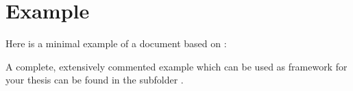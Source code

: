 \section{Example}

Here is a minimal example of a document based on :


A complete, extensively commented example which can be used as framework for your thesis can be found in the subfolder .

\cleardoublepage
{}
{}
\printindex

